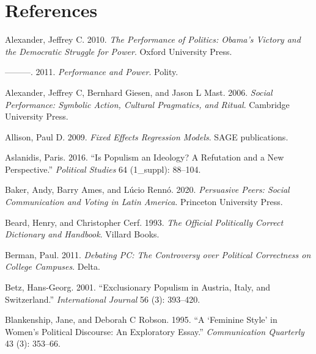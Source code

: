 \documentclass[
  12pt,
]{article}
\newlength{\cslhangindent}
\newlength{\cslentryspacingunit} %
\newenvironment{CSLReferences}[2] %
 {%
  \setlength{\parindent}{0pt}
  \ifodd #1
  \let\oldpar\par
  \def\par{\hangindent=\cslhangindent\oldpar}
  \fi
  \setlength{\parskip}{#2\cslentryspacingunit}
 }%
 {}
\begin{document}
\hypertarget{references}{%
\section{References}\label{references}}

\hypertarget{refs}{}
\begin{CSLReferences}{1}{0}
\leavevmode{}%
Alexander, Jeffrey C. 2010. \emph{The Performance of Politics: Obama's
Victory and the Democratic Struggle for Power}. Oxford University Press.

\leavevmode{}%
---------. 2011. \emph{Performance and Power}. Polity.

\leavevmode{}%
Alexander, Jeffrey C, Bernhard Giesen, and Jason L Mast. 2006.
\emph{Social Performance: Symbolic Action, Cultural Pragmatics, and
Ritual}. Cambridge University Press.

\leavevmode{}%
Allison, Paul D. 2009. \emph{Fixed Effects Regression Models}. SAGE
publications.

\leavevmode{}%
Aslanidis, Paris. 2016. {``Is Populism an Ideology? A Refutation and a
New Perspective.''} \emph{Political Studies} 64 (1\_suppl): 88--104.

\leavevmode{}%
Baker, Andy, Barry Ames, and Lúcio Rennó. 2020. \emph{Persuasive Peers:
Social Communication and Voting in Latin America}. Princeton University
Press.

\leavevmode{}%
Beard, Henry, and Christopher Cerf. 1993. \emph{The Official Politically
Correct Dictionary and Handbook}. Villard Books.

\leavevmode{}%
Berman, Paul. 2011. \emph{Debating PC: The Controversy over Political
Correctness on College Campuses}. Delta.

\leavevmode{}%
Betz, Hans-Georg. 2001. {``Exclusionary Populism in Austria, Italy, and
Switzerland.''} \emph{International Journal} 56 (3): 393--420.

\leavevmode{}%
Blankenship, Jane, and Deborah C Robson. 1995. {``A {`Feminine Style'}
in Women's Political Discourse: An Exploratory Essay.''}
\emph{Communication Quarterly} 43 (3): 353--66.


\end{CSLReferences}
\end{document}
